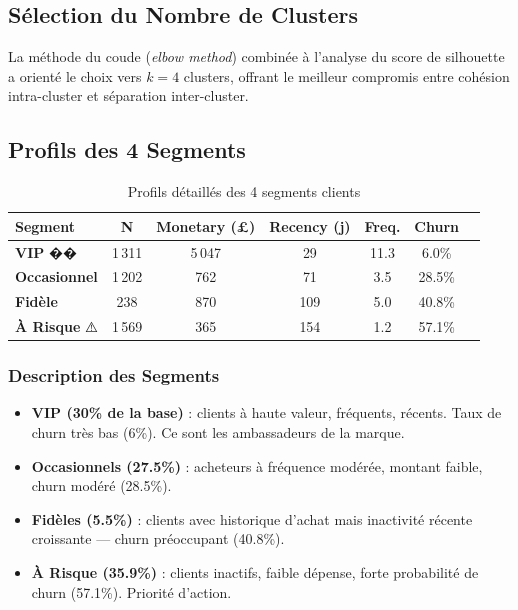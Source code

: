 \documentclass[12pt,a4paper]{article}
\begin{document}
\subsection{Sélection du Nombre de Clusters}

La méthode du coude (\textit{elbow method}) combinée à l'analyse du score de silhouette a
orienté le choix vers $k = 4$ clusters, offrant le meilleur compromis entre cohésion intra-cluster
et séparation inter-cluster.

\subsection{Profils des 4 Segments}

\begin{table}[H]
\centering
\caption{Profils détaillés des 4 segments clients}
\begin{tabular}{lcccccc}
\toprule
\textbf{Segment} & \textbf{N} & \textbf{Monetary (£)} & \textbf{Recency (j)} & \textbf{Freq.} & \textbf{Churn} \\
\midrule
\textbf{VIP} ��         & 1\,311 & 5\,047 & 29 & 11.3 & 6.0\% \\
\textbf{Occasionnel}     & 1\,202 & 762   & 71 & 3.5  & 28.5\% \\
\textbf{Fidèle}          & 238   & 870   & 109 & 5.0 & 40.8\% \\
\textbf{À Risque} ⚠️    & 1\,569 & 365   & 154 & 1.2 & 57.1\% \\
\bottomrule
\end{tabular}
\end{table}

\subsubsection{Description des Segments}

\begin{itemize}
  \item \textbf{VIP (30\% de la base)} : clients à haute valeur, fréquents, récents.
        Taux de churn très bas (6\%). Ce sont les ambassadeurs de la marque.
  \item \textbf{Occasionnels (27.5\%)} : acheteurs à fréquence modérée,
        montant faible, churn modéré (28.5\%).
  \item \textbf{Fidèles (5.5\%)} : clients avec historique d'achat mais inactivité
        récente croissante — churn préoccupant (40.8\%).
  \item \textbf{À Risque (35.9\%)} : clients inactifs, faible dépense, forte
        probabilité de churn (57.1\%). Priorité d'action.
\end{itemize}
\end{document}
